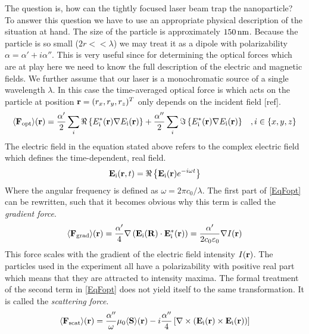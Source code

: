 The question is, how can the tightly focused laser beam trap the nanoparticle? To answer this question we have to use an appropriate physical description of the situation at hand. The size of the particle is approximately $150\nm$. Because the particle is so small ($2r<<\lambda$) we may treat it as a dipole with polarizability $\alpha=\alpha'+i\alpha''$. This is very useful since for determining the optical forces which are at play here we need to know the full description of the electric and magnetic fields. We further assume that our laser is a monochromatic source of a single wavelength $\lambda$. In this case the time-averaged optical force is which acts on the particle at position $\vc{r}=(r_x, r_y, r_z)^T$ only depends on the incident field [ref]. 
\begin{equation}
	\av{\field{F}{opt}}(\vc{r})=\frac{\alpha'}{2}\sum\limits_{i}\Re\left\{\de{E}{i}^*(\vc{r})\nabla\de{E}{i}(\vc{r})\right\}+\frac{\alpha''}{2}\sum\limits_{i}\Im\left\{\de{E}{i}^*(\vc{r})\nabla\de{E}{i}(\vc{r})\right\}\;\;\;, i\in\{x,y,z\}
\end{equation}
The electric field in the equation stated above refers to the complex electric field which defines the time-dependent, real field.
\begin{equation}\label{EqFopt}
	\field{E}{i}(\vc{r},t)=\Re\left\{\field{E}{i}(\vc{r})e^{-i\omega t}\right\}
\end{equation}
Where the angular frequency is defined as $\omega=2\pi c_0/\lambda$. The first part of \autoref{EqFopt} can be rewritten, such that it becomes obvious why this term is called the \textit{gradient force}.
\begin{equation}
	\av{\field{F}{grad}}(\vc{r})=\frac{\alpha'}{4}\nabla\left(\field{E}{i}(\vc{R})\cdot\field{E}{i}^*(\vc{r})\right)=\frac{\alpha'}{2c_0\varepsilon_0}\nabla I(\vc{r})
\end{equation} 
This force scales with the gradient of the electric field intensity $I(\vc{r})$. The particles used in the experiment all have a polarizability with positive real part which means that they are attracted to intensity maxima. The formal treatment of the second term in \autoref{EqFopt} does not yield itself to the same transformation. It is called the \textit{scattering force}.
\begin{equation}\label{EqScatteringForce}
	\av{\field{F}{scat}}(\vc{r})=\frac{\alpha''}\omega\mu_0\av{\vc{S}}(\vc{r})-i\frac{\alpha''}{4}\left[\nabla\times\left(\field{E}{i}(\vc{r})\times\field{E}{i}(\vc{r})\right)\right]
\end{equation}
